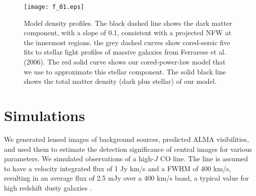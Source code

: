 \documentclass[chicago]{emulateapj}
\begin{document}
\begin{figure}
\begin{center}
\centering
\texttt{[image: f\_01.eps]}
\centering
\end{center}
\vspace{-1mm}
\caption{ Model density profiles. The black dashed line shows the dark matter component, with a slope of 0.1, consistent with a projected NFW at the innermost regions. the grey dashed curves show cored-sersic five fits to stellar light profiles of massive galaxies from Ferrarese et al. (2006). The red solid curve shows our cored-power-law model that we use to approximate this stellar component. The solid black line shows the total matter density (dark plus stellar) of our model. 
\label{fig2}}
\vspace{-1.5mm}
\end{figure}


\section{Simulations}
We generated lensed images of background sources, predicted ALMA visibilities, and used them to estimate the detection significance of central images for various parameters. We simulated observations of a high-$J$ CO line. The line is assumed to have a velocity integrated flux of 1 Jy km/s and a FWHM of 400 km/s, resulting in an average flux of 2.5 mJy over a 400 km/s band, a typical value for high redshift dusty galaxies \citep{Bothwell:12}. 
\end{document}
